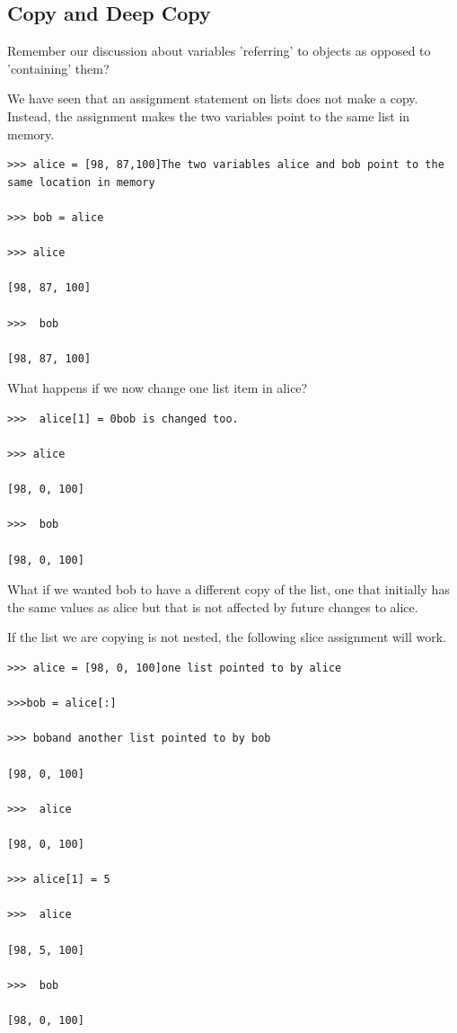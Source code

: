 \documentclass{article}
\begin{document}
\subsection{Copy and Deep Copy}
Remember our discussion about variables 'referring' to objects as opposed to 'containing' them?

We have seen that an assignment statement on lists does not make a copy. Instead, the assignment makes the two variables point to the same list in memory.

\begin{lstlisting}
>>> alice = [98, 87,100]The two variables alice and bob point to the same location in memory

>>> bob = alice

>>> alice

[98, 87, 100] 

>>>  bob

[98, 87, 100]
\end{lstlisting}

What happens if we now change one list item in alice? 

\begin{lstlisting}
>>>  alice[1] = 0bob is changed too.

>>> alice                               

[98, 0, 100]                         

>>>  bob 

[98, 0, 100]
\end{lstlisting}

What if we wanted bob to have a different copy of the list, one that initially has the same values as alice but that is not affected by future changes to alice.

If the list we are copying is not nested, the following slice assignment will work.

\begin{lstlisting}
>>> alice = [98, 0, 100]one list pointed to by alice

>>>bob = alice[:]                          

>>> boband another list pointed to by bob

[98, 0, 100]

>>>  alice

[98, 0, 100]

>>> alice[1] = 5

>>>  alice

[98, 5, 100]

>>>  bob

[98, 0, 100]
\end{lstlisting}
\end{document}
